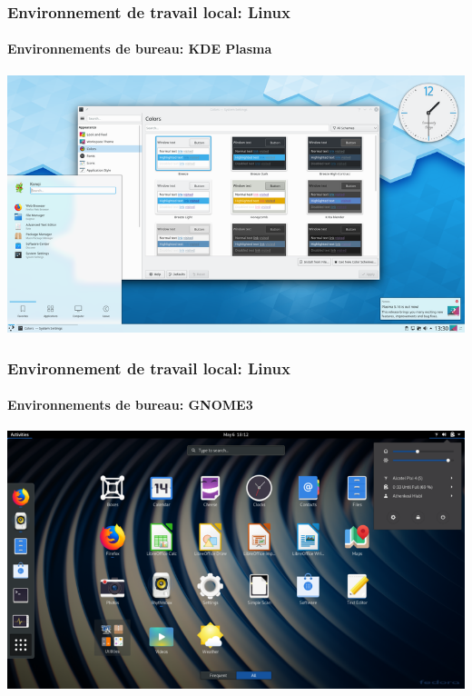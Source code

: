 \documentclass{beamer}
\begin{document}
\begin{frame}
\frametitle{Environnement de travail local: Linux}
\framesubtitle{Environnements de bureau: KDE Plasma}

\begin{center}
	\includegraphics[height=
.8\textheight]{../img/Bweb01-environnement/kde.png}
\end{center}

\end{frame}

\begin{frame}
\frametitle{Environnement de travail local: Linux}
\framesubtitle{Environnements de bureau: GNOME3}

\begin{center}
	\includegraphics[height=
.8\textheight]{../img/Bweb01-environnement/gnome.png}
\end{center}

\end{frame}
\end{document}
